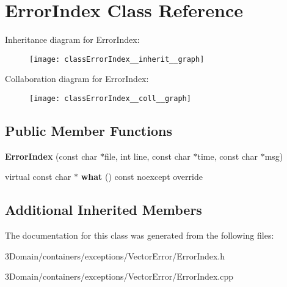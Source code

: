 \hypertarget{classErrorIndex}{}\section{Error\+Index Class Reference}
\label{classErrorIndex}


Inheritance diagram for Error\+Index\+:
\nopagebreak
\begin{figure}[H]
\begin{center}
\leavevmode
\texttt{[image: classErrorIndex\_\_inherit\_\_graph]}
\end{center}
\end{figure}


Collaboration diagram for Error\+Index\+:
\nopagebreak
\begin{figure}[H]
\begin{center}
\leavevmode
\texttt{[image: classErrorIndex\_\_coll\_\_graph]}
\end{center}
\end{figure}
\subsection*{Public Member Functions}
\begin{DoxyCompactItemize}
\item 
\mbox{\label{classErrorIndex_ad3366c9af38a89f19c843c7b99574df2}} 
{\bfseries Error\+Index} (const char $\ast$file, int line, const char $\ast$time, const char $\ast$msg)
\item 
\mbox{\label{classErrorIndex_a372ad689bca810c188f29556f81f356c}} 
virtual const char $\ast$ {\bfseries what} () const noexcept override
\end{DoxyCompactItemize}
\subsection*{Additional Inherited Members}


The documentation for this class was generated from the following files\+:\begin{DoxyCompactItemize}
\item 
3\+Domain/containers/exceptions/\+Vector\+Error/Error\+Index.\+h\item 
3\+Domain/containers/exceptions/\+Vector\+Error/Error\+Index.\+cpp\end{DoxyCompactItemize}
